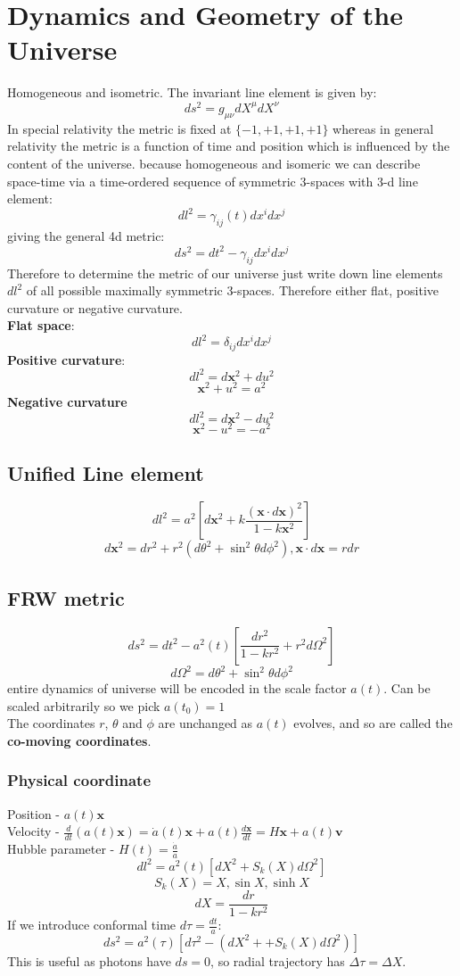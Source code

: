 \documentclass{article}
\begin{document}
\section{Dynamics and Geometry of the Universe}
Homogeneous and isometric. The invariant line element is given by:
$$
ds^2 = g_{\mu \nu}dX^{\mu}dX^{\nu}
$$
In special relativity the metric is fixed at $\{-1,+1,+1,+1\}$ whereas in general relativity the metric is a function of time and position which is influenced by the content of the universe. because homogeneous and isomeric we can describe space-time via a time-ordered sequence of symmetric 3-spaces with 3-d line element:
$$
dl^2 = \gamma_{ij}(t)dx^idx^j
$$
giving the general 4d metric:
$$
ds^2 = dt^2 - \gamma_{ij}dx^idx^j
$$
Therefore to determine the metric of our universe just write down line elements $dl^2$ of all possible maximally symmetric 3-spaces. Therefore either flat, positive curvature or negative curvature.\\
\textbf{Flat space}:
$$
dl^2 = \delta_{ij}dx^i dx^j
$$
\textbf{Positive curvature}:
$$
dl^2 = d\bm{x}^2 +  du^2
$$
$$
\bm{x}^2 + u^2 = a^2
$$
\textbf{Negative curvature}
$$
dl^2 = d\bm{x}^2 -  du^2
$$
$$
\bm{x}^2 - u^2 = -a^2
$$
\subsection{Unified Line element}
\begin{equation}
        dl^2 = a^2 \left[ d\bm{x}^2 + k \frac{(\bm x \cdot d \bm x)^2}{1-k\bm x^2} \right]
\end{equation}
$$
        d \bm{x}^2 = dr^2 + r^2(d \theta^2 + \sin^2 \theta d\phi^2), \bm x \cdot d \bm x = r dr
$$
\subsection{FRW metric}
\begin{equation}
ds^2 = dt^2 - a^2(t) \left[ \frac{dr^2}{1-kr^2} + r^2 d\Omega^2 \right]
\end{equation}
$$
d\Omega^2 = d\theta^2 + \sin^2 \theta d\phi^2
$$
entire dynamics of universe will be encoded in the scale factor $a(t)$. Can be scaled arbitrarily so we pick $a(t_0)=1$\\
The coordinates $r$, $\theta$ and $\phi$ are unchanged as $a(t)$ evolves, and so are called the \textbf{co-moving coordinates}.\\
\subsubsection{Physical coordinate}
Position - $a(t)\bm x$\\
Velocity - $\frac{d}{dt}(a(t)\bm x)= \dot a(t) \bm x +  a(t) \frac{d \bm x}{dt} = H \bm x + a(t) \bm v$\\
Hubble parameter - $H(t) = \frac{\dot a}{a}$
$$
       dl^2 = a^2(t) \left[ dX^2 + S_k(X)d\Omega^2 \right]
$$
$$
S_k(X) = X, \sin X, \sinh X
$$
$$dX = \frac{dr}{1-kr^2}$$
If we introduce conformal time $d\tau = \frac{dt}{a}$:
\begin{equation}
        ds^2 = a^2(\tau) \left[ d\tau^2 - (dX^2 + + S_k(X)d\Omega^2) \right ]
\end{equation}
This is useful as photons have $ds = 0$, so radial trajectory has $\Delta \tau = \Delta X$.
\end{document}
